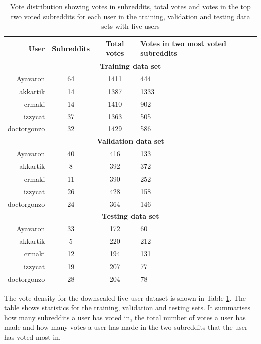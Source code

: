 \begin{table}[h!]
    \centering
    \begin{tabular}{ r | c | c | p{4cm}  }
    \textbf{User} & \textbf{Subreddits} & \textbf{Total votes} & \textbf{Votes in two most voted subreddits} \\ \hline \hline
    \multicolumn{4}{c}{\textbf{Training data set}} \\ \hline \hline
    Ayavaron & 64 & 1411 & 444 \\ \hline
    akkartik & 14  & 1387 & 1333 \\ \hline
    crmaki & 14 & 1410 & 902 \\ \hline
    izzycat & 37 & 1363 & 505 \\ \hline
    doctorgonzo & 32 & 1429 & 586 \\ \hline \hline
    \multicolumn{4}{c}{\textbf{Validation data set}} \\ \hline \hline
    Ayavaron & 40 & 416 & 133 \\ \hline
    akkartik & 8  & 392 & 372 \\ \hline
    crmaki & 11 & 390 & 252 \\ \hline
    izzycat & 26 & 428 & 158 \\ \hline
    doctorgonzo & 24 & 364 & 146 \\ \hline \hline
    \multicolumn{4}{c}{\textbf{Testing data set}} \\ \hline \hline
    Ayavaron & 33 & 172 & 60 \\ \hline
    akkartik & 5  & 220 & 212 \\ \hline
    crmaki & 12 & 194 & 131 \\ \hline
    izzycat & 19 & 207 & 77 \\ \hline
    doctorgonzo & 28 & 204 & 78 \\ \hline
    \end{tabular}
    \caption{Vote distribution showing votes in subreddits, total votes and votes in the top two voted subreddits for each user in the training, validation and testing data sets with five users}
    \label{table:5_user_density}
\end{table}
The vote density for the downscaled five user dataset is shown in Table \ref{table:5_user_density}. The table shows statistics for the training, validation and testing sets. It summarises how many subreddits a user has voted in, the total number of votes a user has made and how many votes a user has made in the two subreddits that the user has voted most in.

